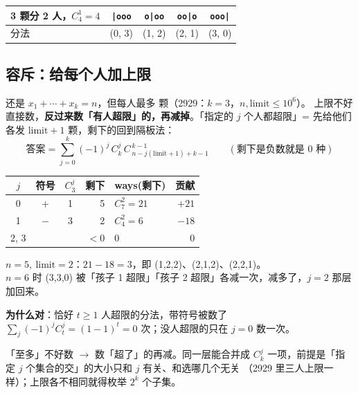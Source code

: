 \begin{center}\small
\begin{tabular}{@{}l cccc@{}}
\toprule
3 颗分 2 人，$C_4^1 = 4$ & \verb+|ooo+ & \verb+o|oo+ & \verb+oo|o+ & \verb+ooo|+\\
\midrule
分法 & (0, 3) & (1, 2) & (2, 1) & (3, 0)\\
\bottomrule
\end{tabular}
\end{center}

\subsection{容斥：给每个人加上限}

还是 $x_1 + \cdots + x_k = n$，但每人最多  颗（2929：$k = 3$，$n, \text{limit} \le 10^6$）。
上限不好直接数，\textbf{反过来数「有人超限」的，再减掉}。「指定的 $j$ 个人都超限」= 先给他们各发 $\text{limit}+1$ 颗，剩下的回到隔板法：
\[
\text{答案} = \sum_{j=0}^{k} (-1)^j\, C_k^j\, C^{\,k-1}_{\,n - j(\text{limit}+1) + k - 1}\qquad(\text{剩下是负数就是 0 种})
\]

\begin{center}\small
\begin{tabular}{@{}c c c r l r@{}}
\toprule
$j$ & 符号 & $C_3^j$ & 剩下 & ways(剩下) & 贡献\\
\midrule
0 & $+$ & 1 & 5 & $C_7^2 = 21$ & $+21$\\
1 & $-$ & 3 & 2 & $C_4^2 = 6$ & $-18$\\
2, 3 & & & $<0$ & 0 & 0\\
\bottomrule
\end{tabular}
\quad
\begin{minipage}{0.4\linewidth}\small
$n = 5,\ \text{limit} = 2$：$21 - 18 = 3$，即 (1,2,2)、(2,1,2)、(2,2,1)。\\[2pt]
$n = 6$ 时 (3,3,0) 被「孩子 1 超限」「孩子 2 超限」各减一次，减多了，$j = 2$ 那层加回来。
\end{minipage}
\end{center}

\textbf{为什么对}：恰好 $t \ge 1$ 人超限的分法，带符号被数了 $\sum_{j} (-1)^j C_t^j = (1-1)^t = 0$ 次；没人超限的只在 $j = 0$ 数一次。

\begin{principle}
「至多」不好数 $\to$ 数「超了」的再减。同一层能合并成 $C_k^j$ 一项，前提是「指定 $j$ 个集合的交」的大小只和 $j$ 有关、和选哪几个无关
（2929 里三人上限一样）；上限各不相同就得枚举 $2^k$ 个子集。
\end{principle}

